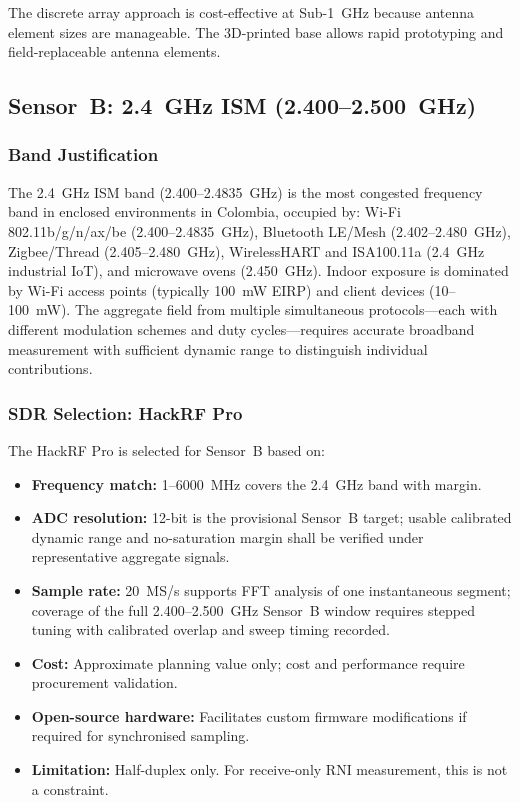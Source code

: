 \documentclass[11pt,a4paper]{article}
\begin{document}
\noindent The discrete array approach is cost-effective at Sub-1~GHz because antenna element sizes are manageable. The 3D-printed base allows rapid prototyping and field-replaceable antenna elements.

\subsection{Sensor~B: 2.4~GHz ISM (2.400--2.500~GHz)}

\subsubsection{Band Justification}

The 2.4~GHz ISM band (2.400--2.4835~GHz) is the most congested frequency band in enclosed environments in Colombia, occupied by: Wi-Fi 802.11b/g/n/ax/be (2.400--2.4835~GHz), Bluetooth LE/Mesh (2.402--2.480~GHz), Zigbee/Thread (2.405--2.480~GHz), WirelessHART and ISA100.11a (2.4~GHz industrial IoT), and microwave ovens (2.450~GHz). Indoor exposure is dominated by Wi-Fi access points (typically 100~mW EIRP) and client devices (10--100~mW). The aggregate field from multiple simultaneous protocols---each with different modulation schemes and duty cycles---requires accurate broadband measurement with sufficient dynamic range to distinguish individual contributions.

\subsubsection{SDR Selection: HackRF Pro}

The HackRF Pro is selected for Sensor~B based on:

\begin{itemize}
    \item \textbf{Frequency match:} 1--6000~MHz covers the 2.4~GHz band with margin.
    \item \textbf{ADC resolution:} 12-bit is the provisional Sensor~B target; usable calibrated dynamic range and no-saturation margin shall be verified under representative aggregate signals.
    \item \textbf{Sample rate:} 20~MS/s supports FFT analysis of one instantaneous segment; coverage of the full 2.400--2.500~GHz Sensor~B window requires stepped tuning with calibrated overlap and sweep timing recorded.
    \item \textbf{Cost:} Approximate planning value only; cost and performance require procurement validation.
    \item \textbf{Open-source hardware:} Facilitates custom firmware modifications if required for synchronised sampling.
    \item \textbf{Limitation:} Half-duplex only. For receive-only RNI measurement, this is not a constraint.
\end{itemize}
\end{document}
